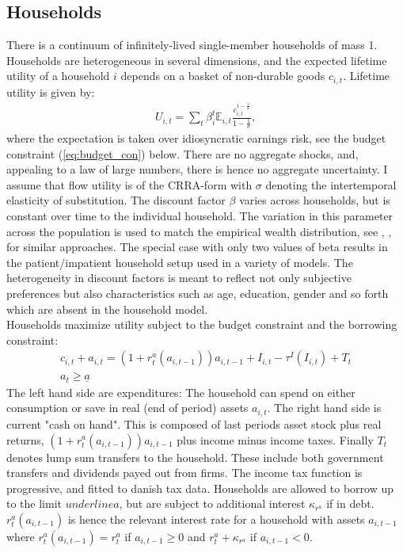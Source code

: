 \subsection{Households}
There is a continuum of infinitely-lived single-member households of mass 1. Households are heterogeneous in several dimensions, and the expected lifetime utility of a household $i$ depends on a basket of non-durable goods $c_{i,t}$. Lifetime utility is given by:
\begin{align}
U_{i,t}=\sum_{t}\beta_{i}^{t}\mathbb{E}_{i,t} \frac{c_{i,t}^{1-\frac{1}{\sigma}}}{1-\frac{1}{\sigma}},\label{eq:utility}
\end{align} 
where the expectation is taken over idiosyncratic earnings risk, see the budget constraint (\ref{eq:budget_con}) below. There are no aggregate shocks, and, appealing to a law of large numbers, there is hence no aggregate uncertainty. I assume that flow utility is of the CRRA-form with $\sigma$ denoting the intertemporal elasticity of substitution.
The discount factor $\beta$ varies across households, but is constant over time to the individual household. The variation in this parameter across the population is used to match the empirical wealth distribution, see \citet{krusell1998income}, \citet{krueger2016macroeconomics}, \citet{carroll2017distribution} for similar approaches. The special case with only two values of beta results in the patient/impatient household setup used in a variety of models. The heterogeneity in discount factors is meant to reflect not only subjective preferences but also characteristics such as age, education, gender and so forth which are absent in the household model. \\
Households maximize utility subject to the budget constraint and the borrowing constraint: 
\begin{gather}
c_{i,t}+a_{i,t}= (1+r_{t}^{a}(a_{i,t-1})) a_{i,t-1} +  I_{i,t} -\tau^{I}\left(I_{i,t}\right)+T_{t} \label{eq:budget_con}  \\
a_{t}\geq\underline{a} \label{eq:borrow_con} 
\end{gather}
The left hand side are expenditures: The household can spend on either consumption or save in real (end of period) assets $a_{i,t}$. The right hand side is current "cash on hand". This is composed of last periods asset stock plus real returns, $\left(1+r_{t}^{a}(a_{i,t-1})\right)a_{i,t-1}$ plus income minus income taxes. Finally $T_t$ denotes lump sum transfers to the household. These include both government transfers and dividends payed out from firms. The income tax function is progressive, and fitted to danish tax data. 
Households are allowed to borrow up to the limit $underline{a}$, but are subject to additional interest $\kappa_{r^{a}}$ if in debt. $r_{t}^{a}(a_{i,t-1})$ is hence the relevant interest rate for a household with assets $a_{i,t-1}$ where $r_{t}^{a}(a_{i,t-1})=r_{t}^{a}$ if  $a_{i,t-1}\geq0$ and $r_{t}^{a}+\kappa_{r^{a}}$ if $a_{i,t-1}<0$.


